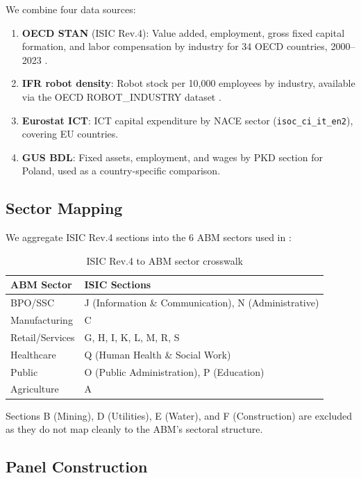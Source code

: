 \documentclass[11pt,a4paper]{article}
\begin{document}
We combine four data sources:

\begin{enumerate}
    \item \textbf{OECD STAN} (ISIC Rev.4): Value added, employment, gross fixed capital formation, and labor compensation by industry for 34 OECD countries, 2000--2023 \autocite{oecd2024stan}.
    \item \textbf{IFR robot density}: Robot stock per 10,000 employees by industry, available via the OECD ROBOT\_INDUSTRY dataset \autocite{ifr2024world}.
    \item \textbf{Eurostat ICT}: ICT capital expenditure by NACE sector (\texttt{isoc\_ci\_it\_en2}), covering EU countries.
    \item \textbf{GUS BDL}: Fixed assets, employment, and wages by PKD section for Poland, used as a country-specific comparison.
\end{enumerate}

\subsection{Sector Mapping}

We aggregate ISIC Rev.4 sections into the 6 ABM sectors used in \autocite{maciaszek2026acceleration}:

\begin{table}[H]
\centering
\caption{ISIC Rev.4 to ABM sector crosswalk}
\label{tab:crosswalk}
\begin{tabular}{ll}
\toprule
\textbf{ABM Sector} & \textbf{ISIC Sections} \\
\midrule
BPO/SSC & J (Information \& Communication), N (Administrative) \\
Manufacturing & C \\
Retail/Services & G, H, I, K, L, M, R, S \\
Healthcare & Q (Human Health \& Social Work) \\
Public & O (Public Administration), P (Education) \\
Agriculture & A \\
\bottomrule
\end{tabular}
\end{table}

Sections B (Mining), D (Utilities), E (Water), and F (Construction) are excluded as they do not map cleanly to the ABM's sectoral structure.

\subsection{Panel Construction}
\end{document}
